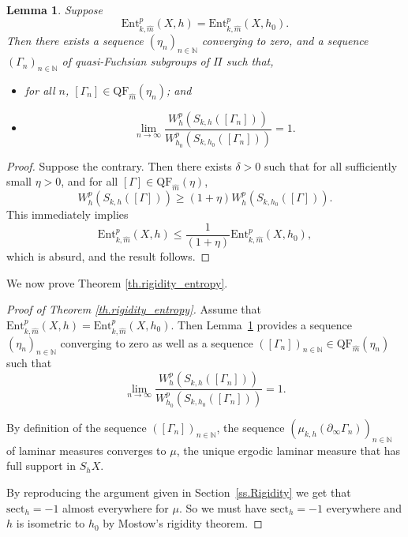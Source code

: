 \documentclass[11pt]{article}
\theoremstyle{plain}
\newtheorem{lemma}[theorem]{Lemma}
\theoremstyle{definition}
\newcommand{\sect}{\mathrm{sect}}
\newcommand{\Ent}{\mathrm{Ent}}
\newcommand{\QF}{\mathrm{QF}}
\newcommand{\bord}{\partial_{\infty}}
\begin{document}
\begin{lemma}\label{lem_converging_sequence}
Suppose
\begin{equation*}
\Ent^{p}_{k,\hat m}(X,h)=\Ent^{p}_{k,\hat m}(X,h_0).
\end{equation*}
Then there exists a sequence $(\eta_n)_{n\in\mathbb{N}}$ converging to zero, and a sequence $(\Gamma_n)_{n\in\mathbb{N}}$ of quasi-Fuchsian subgroups of $\Pi$ such that,
\begin{itemize}
\item for all $n$, $[\Gamma_n]\in\QF_{\hat m}(\eta_n)$; and
\item
\begin{equation*}
\lim_{n\to\infty}\frac{W^{p}_{h}(S_{k,h}([\Gamma_n]))}{W^{p}_{h_0}(S_{k,h_0}([\Gamma_n]))}=1.
\end{equation*}
\end{itemize}
\end{lemma}

\begin{proof}
Suppose the contrary. Then there exists $\delta>0$ such that for all sufficiently small $\eta>0$, and for all $[\Gamma]\in\QF_{\hat m}(\eta)$,
\begin{equation*}
W^{p}_{h}(S_{k,h}([\Gamma]))\geq (1+\eta) W^{p}_{h}(S_{k,h_0}([\Gamma])).
\end{equation*}
This immediately implies
\begin{equation*}
\Ent^p_{k,\hat m}(X,h)\leq\frac{1}{(1+\eta)}\Ent^{p}_{k,\hat m}(X,h_0),
\end{equation*}
which is absurd, and the result follows.
\end{proof}

We now prove Theorem \ref{th.rigidity_entropy}.

\begin{proof}[Proof of Theorem \ref{th.rigidity_entropy}] Assume that $\Ent^{p}_{k,\hat m}(X,h)=\Ent^{p}_{k,\hat m}(X,h_0)$. Then Lem\-ma~\ref{lem_converging_sequence} provides a sequence $(\eta_n)_{n\in\mathbb{N}}$ converging to zero as well as a sequence $([\Gamma_n])_{n\in\mathbb{N}}\in\QF_{\hat m}(\eta_n)$ such that
\begin{equation*}
\lim_{n\to\infty}\frac{W^{p}_{h}(S_{k,h}([\Gamma_n]))}{W^{p}_{h_0}(S_{k,h_0}([\Gamma_n]))}=1.
\end{equation*}

By definition of the sequence $([\Gamma_n])_{n\in\mathbb{N}}$, the sequence $(\mu_{k,h}(\bord \Gamma_n))_{n\in\mathbb{N}}$ of laminar measures converges to $\mu$, the unique ergodic laminar measure that has full support in $S_hX$.

By reproducing the argument given in Section~\ref{ss.Rigidity} we get that $\sect_h=-1$ almost everywhere for $\mu$. So we must have $\sect_h=-1$ everywhere and $h$ is isometric to $h_0$ by Mostow's rigidity theorem.
\end{proof}
\end{document}
